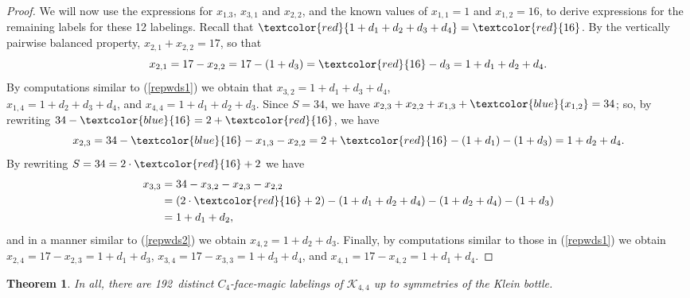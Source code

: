 \documentclass[10pt, reqno]{amsart}
\theoremstyle{definition}
\theoremstyle{plain}
\newtheorem{theorem}[definition]{Theorem}
\begin{document}
\begin{proof}
We will now use the expressions for $x_{1.3}$, $x_{3,1}$ and $x_{2,2}$, 
and the known values of $x_{1,1}=1$ and $x_{1,2}=16$, 
to derive expressions for
the remaining labels for these 12 labelings. 
Recall that $\textcolor{red}{1+d_1+d_2+d_3+d_4}=\textcolor{red}{16}$. 
By the vertically pairwise balanced property, 
$x_{2,1} +x_{2,2}= 17$, so that
\begin{equation}
  x_{2,1}=17-x_{2,2}=17-(1+d_3)=\textcolor{red}{16}-d_3=1+d_1+d_2+d_4.  \label{repwds1}
\end{equation}
By computations similar to (\ref{repwds1}) we obtain that $x_{3,2}=1+d_1+d_3+d_4$,\\ 
$x_{1,4}=1+d_2+d_3+d_4$, and $x_{4,4}=1+d_1+d_2+d_3$.
Since $S=34$, we have $x_{2,3}+x_{2,2}+x_{1,3}+\textcolor{blue}{x_{1,2}}=34$; 
so, by rewriting $34-\textcolor{blue}{16}=2+\textcolor{red}{16}$, we have
\begin{equation*}
  x_{2,3}=34-\textcolor{blue}{16}-x_{1,3}-x_{2,2}=2+\textcolor{red}{16}-(1+d_1)-(1+d_3)=1+d_2+d_4.  
\end{equation*}
By rewriting $S=34=2\cdot\textcolor{red}{16}+2$ we have 
\begin{equation}\label{repwds2}
\begin{aligned}
 x_{3,3}&=34-x_{3,2}-x_{2,3}-x_{2,2}\\
    &=(2\cdot\textcolor{red}{16}+2)-(1+d_1+d_2+d_4)-(1+d_2+d_4)-(1+d_3)\\
    &=1+d_1+d_2,
 \end{aligned}
\end{equation}
and in a manner similar to (\ref{repwds2}) we obtain $x_{4,2}=1+d_2+d_3$.
Finally, by computations similar to those in (\ref{repwds1}) we obtain
$ x_{2,4}=17-x_{2,3}=1+d_1+d_3$, $x_{3,4}=17-x_{3,3}=1+d_3+d_4$, and
$x_{4,1}=17-x_{4,2}=1+d_1+d_4$.
\end{proof}


\begin{theorem}\label{Numberoflabels}
In all, there are \rm 192\it\ distinct $C_4$-face-magic labelings of $\mathcal{K}_{4,4}$ up to symmetries of the Klein bottle.
\end{theorem}
\end{document}
